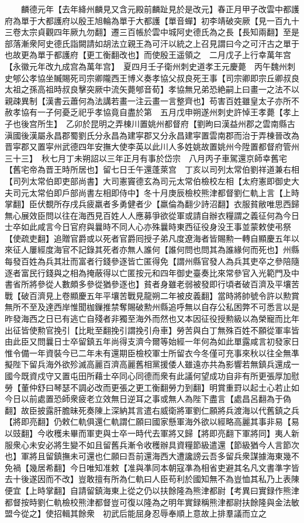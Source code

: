 　　麟德元年【去年絳州麟見又含元殿前麟趾見於是改元】春正月甲子改雲中都護府為單于大都護府以殷王旭輪為單于大都護【單音蟬】初李靖破突厥【見一百九十三卷太宗貞觀四年厥九勿翻】遷三百帳於雲中城阿史德氏為之長【長知兩翻】至是部落漸衆阿史德氏詣闕請如胡法立親王為可汗以統之上召見謂曰今之可汗古之單于也故更為單于都護府【更工衡翻改也】而使殷王遥領之　二月戊子上行幸萬年宫【永徽元年改九成宫為萬年宫】　夏四月壬子衛州刺史道孝王元慶薨　丙午魏州刺史郇公孝協坐贓賜死司宗卿隴西王博义奏孝協父叔良死王事【司宗卿即宗丘卿叔良太祖之孫高祖時叔良擊突厥中流矢薨郇音荀】孝協無兄弟恐絶嗣上曰畫一之法不以親疎異制【漢書云蕭何為法講若畫一注云畫一言整齊也】苟害百姓雖皇太子亦所不赦孝協有一子何憂乏祀乎孝協竟自盡於第　五月戊申朔遂州刺史許悼王孝薨【孝上子也後宫所生】　乙卯於昆明之弄棟川置姚州都督府【劉昫曰漢益州郡之雲南縣古滇國後漢屬永昌郡蜀劉氏分永昌為建寜郡又分永昌建寜置雲南郡而治于弄棟晉改為晋寜郡又置寜州武德四年安撫大使李英以此川人多姓姚故置姚州今陞置都督府管州三十三】　秋七月丁未朔詔以三年正月有事於岱宗　八月丙子車駕還京師幸舊宅【舊宅帝為晋王時所居也】留七日壬午還蓬萊宫　丁亥以司列太常伯劉祥道兼右相【司列太常伯即吏部尚書】大司憲竇德玄為司元太常伯檢校左相【太府憲即御史大夫司元太常伯即戶部尚書左相即侍中】冬十月庚辰檢校熊津都督劉仁軌上言【上時掌翻】臣伏覩所存戌兵疲羸者多勇健者少【羸倫為翻少詩沼翻】衣服貧敝唯思西歸無心展效臣問以往在海西見百姓人人應募爭欲從軍或請自辦衣糧謂之義征何為今日士卒如此咸言今日官府與曩時不同人心亦殊曩時東西征役身没王事並蒙敕使弔祭【使疏吏翻】追贈官爵或以死者官爵囘授子弟凡度遼海者皆賜勲一轉自顯慶五年以來征人屢經度海官不記錄其死者亦無人誰何【誰何問也問其為誰緣何而死也】州縣每發百姓為兵其壯而富者行錢參逐皆亡匿得免【謂州縣官發人為兵其吏卒之參陪隨逐者富民行錢與之相為掩蔽得以亡匿按元和四年御史臺奏比來常參官入光範門及中書省所將參從人數頗多參從猶參逐也】貧者身雖老弱被發即行頃者破百濟及平壤苦戰【破百濟見上卷顯慶五年平壤苦戰見龍朔二年被皮義翻】當時將帥號令許以勲賞無所不至及達西岸惟聞枷鏁推禁奪賜破勲州縣追呼無以自存公私困弊不可悉言以是昨發海西之日已有逃亡自殘者非獨至海外而然也又本因征役授勲級以為榮寵而比年出征皆使勲官挽引【比毗至翻挽引謂挽引舟車】勞苦與白丁無殊百姓不願從軍率皆由此臣又問曩日士卒留鎮五年尚得支濟今爾等始經一年何為如此單露咸言初發家日惟令備一年資裝今已二年未有還期臣檢校軍士所留衣今冬僅可充事來秋以往全無凖擬陛下留兵海外欲殄滅高麗百濟高麗舊相黨援倭人雖遠亦共為影響若無鎮兵還成一國今既資戍守又置屯田所藉士卒同心同德而衆有此議何望成功自非有所更張厚加慰勞【董仲舒曰琴瑟不調必改而更張之更工衡翻勞力到翻】明賞重罸以起士心若止如今日以前處置恐師衆疲老立效無日逆耳之事或無人為陛下盡言【處昌呂翻為于偽翻】故臣披露肝膽昧死奏陳上深納其言遣右威衛將軍劉仁願將兵渡海以代舊鎮之兵【將即亮翻】仍敕仁軌俱還仁軌謂仁願曰國家懸軍海外欲以經略高麗其事非易【易以豉翻】今收穫未畢而軍吏與士卒一時代去軍將又歸【將即亮翻下軍將同】夷人新服衆心未安必將生變不如且留舊兵漸令收穫辦具資糧節級遣還【節級猶今人言節次也】軍將且留鎮撫未可還也仁願曰吾前還海西大遭讒謗云吾多留兵衆謀據海東幾不免禍【幾居希翻】今日唯知准敕【准與凖同本朝寇凖為相省吏避其名凡文書準字皆去十後遂因而不改】豈敢擅有所為仁軌曰人臣苟利於國知無不為豈恤其私乃上表陳便宜【上時掌翻】自請留鎮海東上從之仍以扶餘隆為熊津都尉【考異曰實録作熊津都督按時劉仁軌檢校熊津都督豈可復以隆為之明年實録稱熊津都尉扶餘隆與金法敏盟今從之】使招輯其餘衆　初武后能屈身忍辱奉順上意故上排羣議而立之